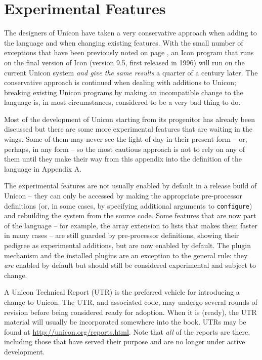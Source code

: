 \chapter{Experimental Features}

The designers of Unicon have taken a very conservative approach when adding to
the language and when changing existing features. With the small number of
exceptions that have been previously noted on page \pageref{Unicon-Icon}, an
Icon program that runs on the final version of Icon (version 9.5, first released
in 1996) will run on the current Unicon system {\em and give the same results\/}
a quarter of a century later. The conservative approach is continued when
dealing with additions to Unicon; breaking existing Unicon programs by making an
incompatible change to the language is, in most circumstances, considered to be
a very bad thing to do.

Most of the development of Unicon starting from its progenitor has already been
discussed but there are some more experimental features that are waiting in the
wings. Some of them may never see the light of day in their present form -- or,
perhaps, in any form -- so the most cautious approach is not to rely on any of
them until they make their way from this appendix into the definition of the
language in Appendix A.

The experimental features are not usually enabled by default in a
release build of Unicon -- they can only be accessed by making the appropriate
pre-processor definitions (or, in some cases, by specifying additional arguments
to \texttt{configure}) and rebuilding the system from the source code. Some
features that are now part of the language -- for example, the array extension
to lists that makes them faster in many cases -- are still guarded by
pre-processor definitions, showing their pedigree as experimental additions, but
are now enabled by default. The plugin mechanism and the installed plugins are
an exception to the general rule: they {\em are\/} enabled by default but should
still be considered experimental and subject to change.

A Unicon Technical Report (UTR) is the preferred vehicle for introducing a
change to Unicon.  The UTR, and associated code, may undergo several rounds of
revision before being considered ready for adoption. When it is (ready), the UTR
material will usually be incorporated somewhere into the book. UTRs may be found
at \url{http://unicon.org/reports.html}. Note that {\em all\/} of the reports
are there, including those that have served their purpose and are no longer
under active development.

